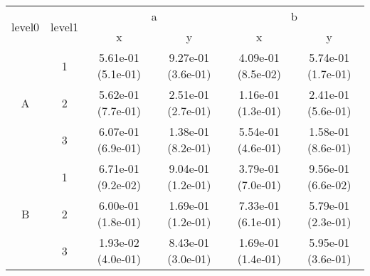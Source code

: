 \begin{tabular}{cccccc}
\toprule
\multirow{2}{*}{level0} & \multirow{2}{*}{level1}&\multicolumn{2}{c}{a}&\multicolumn{2}{c}{b}\tabularnewline
\cmidrule(lr){3-4}
\cmidrule(lr){5-6}
&&x&y&x&y\tabularnewline
\midrule
\multirow{3}{*}{A}&1& 5.61e-01 (5.1e-01)& 9.27e-01 (3.6e-01)& 4.09e-01 (8.5e-02)& 5.74e-01 (1.7e-01)\tabularnewline
&2& 5.62e-01 (7.7e-01)& 2.51e-01 (2.7e-01)& 1.16e-01 (1.3e-01)& 2.41e-01 (5.6e-01)\tabularnewline
&3& 6.07e-01 (6.9e-01)& 1.38e-01 (8.2e-01)& 5.54e-01 (4.6e-01)& 1.58e-01 (8.6e-01)\tabularnewline
\midrule
\multirow{3}{*}{B}&1& 6.71e-01 (9.2e-02)& 9.04e-01 (1.2e-01)& 3.79e-01 (7.0e-01)& 9.56e-01 (6.6e-02)\tabularnewline
&2& 6.00e-01 (1.8e-01)& 1.69e-01 (1.2e-01)& 7.33e-01 (6.1e-01)& 5.79e-01 (2.3e-01)\tabularnewline
&3& 1.93e-02 (4.0e-01)& 8.43e-01 (3.0e-01)& 1.69e-01 (1.4e-01)& 5.95e-01 (3.6e-01)\tabularnewline
\bottomrule
\end{tabular}
